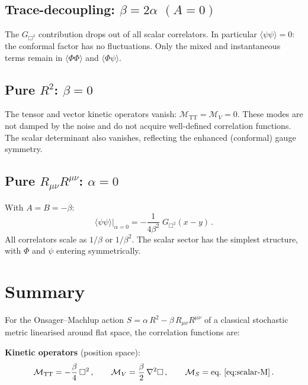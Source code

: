 \documentclass[11pt,a4paper]{article}
\newcommand{\TT}{\mathrm{TT}}
\theoremstyle{definition}
\theoremstyle{remark}
\begin{document}
\subsection{Trace-decoupling: $\beta = 2\alpha$ \texorpdfstring{$(A=0)$}{(A=0)}}

The $G_{\Box^2}$ contribution drops out of all scalar correlators.
In particular $\langle\psi\psi\rangle = 0$: the conformal factor
has no fluctuations.  Only the mixed and instantaneous terms remain
in $\langle\Phi\Phi\rangle$ and $\langle\Phi\psi\rangle$.

\subsection{Pure $R^2$: $\beta = 0$}

The tensor and vector kinetic operators vanish:
$\mathcal{M}_\TT = \mathcal{M}_V = 0$.
These modes are not damped by the noise and do not acquire
well-defined correlation functions.  The scalar determinant also
vanishes, reflecting the enhanced (conformal) gauge symmetry.

\subsection{Pure $R_{\mu\nu}R^{\mu\nu}$: $\alpha = 0$}

With $A = B = -\beta$:
\begin{equation}
  \langle\psi\psi\rangle\big|_{\alpha=0}
  = -\frac{1}{4\beta^2}\;G_{\Box^2}(x-y)\,.
\end{equation}
All correlators scale as $1/\beta$ or $1/\beta^2$.  The scalar sector
has the simplest structure, with $\Phi$ and $\psi$ entering
symmetrically.

\section{Summary}
\label{sec:summary}

For the Onsager--Machlup action
$S = \alpha\,R^2 - \beta\,R_{\mu\nu}R^{\mu\nu}$
of a classical stochastic metric linearised around flat space,
the correlation functions are:

\medskip
\noindent\textbf{Kinetic operators} (position space):
\begin{equation*}
  \mathcal{M}_\TT = -\frac{\beta}{4}\,\Box^2\,,\qquad
  \mathcal{M}_V = \frac{\beta}{2}\,\nabla^2\Box\,,\qquad
  \mathcal{M}_S = \text{eq.~\eqref{eq:scalar-M}}\,.
\end{equation*}
\end{document}
